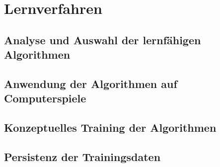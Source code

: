 \section{Lernverfahren}
\label{sec:lernverfahren}
\subsection{Analyse und Auswahl der lernfähigen Algorithmen}

\subsection{Anwendung der Algorithmen auf Computerspiele}

\subsection{Konzeptuelles Training der Algorithmen}

\subsection{Persistenz der Trainingsdaten}